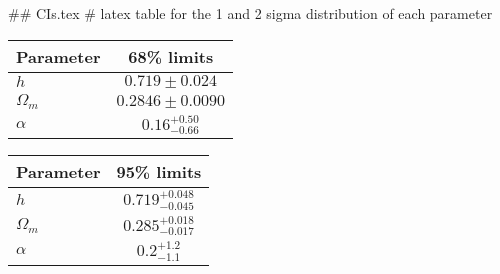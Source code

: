 ## CIs.tex
# latex table for the 1 and 2 sigma distribution of each parameter

\begin{tabular} { l  c}
 Parameter &  68\% limits\\
\hline
{\boldmath$h              $} & $0.719\pm 0.024            $\\
{\boldmath$\Omega_m       $} & $0.2846\pm 0.0090          $\\
{\boldmath$\alpha         $} & $0.16^{+0.50}_{-0.66}      $\\
\hline
\end{tabular}

\begin{tabular} { l  c}
 Parameter &  95\% limits\\
\hline
{\boldmath$h              $} & $0.719^{+0.048}_{-0.045}   $\\
{\boldmath$\Omega_m       $} & $0.285^{+0.018}_{-0.017}   $\\
{\boldmath$\alpha         $} & $0.2^{+1.2}_{-1.1}         $\\
\hline
\end{tabular}
